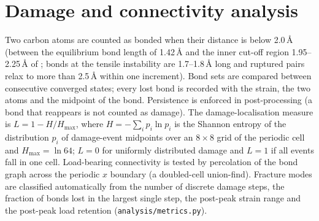 \section{Damage and connectivity analysis}
\label{sec:damage}
Two carbon atoms are counted as bonded when their distance is below 2.0\,\AA{} (between the equilibrium bond length of 1.42\,\AA{} and the inner cut-off region 1.95--2.25\,\AA{} of \rebo{}; bonds at the tensile instability are 1.7--1.8\,\AA{} long and ruptured pairs relax to more than 2.5\,\AA{} within one increment). Bond sets are compared between consecutive converged states; every lost bond is recorded with the strain, the two atoms and the midpoint of the bond. Persistence is enforced in post-processing (a bond that reappears is not counted as damage). The damage-localisation measure is $L=1-H/H_\mathrm{max}$, where $H=-\sum_i p_i\ln p_i$ is the Shannon entropy of the distribution $p_i$ of damage-event midpoints over an $8\times8$ grid of the periodic cell and $H_\mathrm{max}=\ln 64$; $L=0$ for uniformly distributed damage and $L=1$ if all events fall in one cell. Load-bearing connectivity is tested by percolation of the bond graph across the periodic $x$ boundary (a doubled-cell union-find). Fracture modes are classified automatically from the number of discrete damage steps, the fraction of bonds lost in the largest single step, the post-peak strain range and the post-peak load retention (\texttt{analysis/metrics.py}).

